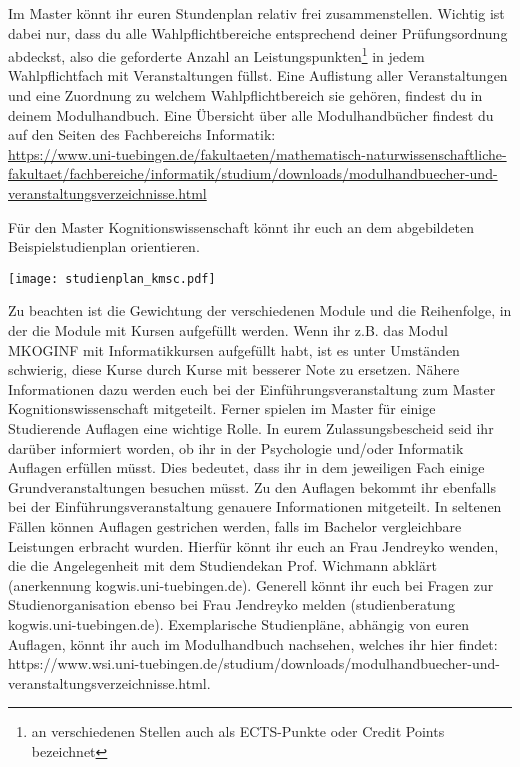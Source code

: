 Im Master könnt ihr euren Stundenplan relativ frei zusammenstellen. Wichtig ist dabei nur, dass du alle Wahlpflichtbereiche entsprechend deiner Prüfungsordnung abdeckst, also die geforderte Anzahl an Leistungspunkten\footnote{an verschiedenen Stellen auch als ECTS-Punkte oder Credit Points bezeichnet} in jedem Wahlpflichtfach mit Veranstaltungen füllst. Eine Auflistung aller Veranstaltungen und eine Zuordnung zu welchem Wahlpflichtbereich sie gehören, findest du in deinem Modulhandbuch. Eine Übersicht über alle Modulhandbücher findest du auf den Seiten des Fachbereichs Informatik: \\ 
\url{https://www.uni-tuebingen.de/fakultaeten/mathematisch-naturwissenschaftliche-fakultaet/fachbereiche/informatik/studium/downloads/modulhandbuecher-und-veranstaltungsverzeichnisse.html}

\ifkogwiss
Für den Master Kognitionswissenschaft könnt ihr euch an dem abgebildeten Beispielstudienplan orientieren.
\begin{center}
	\texttt{[image: studienplan\_kmsc.pdf]}
\end{center}
Zu beachten ist die Gewichtung der verschiedenen Module und die Reihenfolge, in der die Module mit Kursen aufgefüllt werden. Wenn
ihr z.B. das Modul MKOGINF mit Informatikkursen aufgefüllt habt, ist es unter Umständen schwierig, diese Kurse durch Kurse mit
besserer Note zu ersetzen. Nähere Informationen dazu werden euch bei der Einführungsveranstaltung zum Master Kognitionswissenschaft mitgeteilt. Ferner spielen im Master für einige Studierende Auflagen eine wichtige Rolle. In eurem Zulassungsbescheid seid ihr darüber informiert worden, ob ihr in der Psychologie und/oder Informatik Auflagen erfüllen müsst. Dies bedeutet, dass ihr in dem jeweiligen Fach einige Grundveranstaltungen besuchen müsst. Zu den Auflagen bekommt ihr ebenfalls bei der Einführungsveranstaltung genauere Informationen mitgeteilt. In seltenen Fällen können Auflagen gestrichen werden, falls im Bachelor vergleichbare Leistungen erbracht wurden. Hierfür könnt ihr euch an Frau Jendreyko wenden, die die Angelegenheit mit dem Studiendekan Prof. Wichmann abklärt (anerkennung \At kogwis.uni-tuebingen.de). Generell könnt ihr euch bei Fragen zur Studienorganisation ebenso bei Frau Jendreyko melden (studienberatung \At kogwis.uni-tuebingen.de). Exemplarische Studienpläne, abhängig von euren Auflagen, könnt ihr auch im Modulhandbuch nachsehen, welches ihr hier findet: https://www.wsi.uni-tuebingen.de/studium/downloads/modulhandbuecher-und-veranstaltungsverzeichnisse.html.

